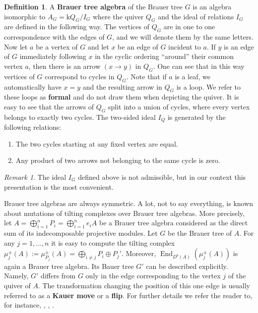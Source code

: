 \documentclass[12pt]{amsart}
\theoremstyle{plain}
\theoremstyle{remark}
\newtheorem*{remark}{Remark}
\theoremstyle{definition}
\newtheorem{definition}{Definition}[section]
\newcommand{\End}{\mathop{\mathrm{End}}\nolimits}
\def\kk{\mathrm{k}}
\begin{document}
\begin{definition} A {\bf Brauer tree algebra} of the Brauer tree $G$ is an algebra isomorphic to $A_G = \kk Q_G/I_G$ where the quiver $Q_G$ and the ideal of relations $I_G$ are defined in the following way. The vertices of $Q_G$ are in one to one correspondence with the edges of $G$, and we will denote them by the same letters. Now let $a$ be a vertex of $G$ and let $x$ be an edge of $G$ incident to $a$. If $y$ is an edge of $G$ immediately following $x$ in the cyclic ordering ``around'' their common vertex $a$, then there is an arrow $(x \to y)$ in $Q_G$. One can see that in this way vertices of $G$ correspond to cycles in $Q_G$. Note that if $a$ is a leaf, we automatically have $x = y$ and the resulting arrow in $Q_G$ is a loop. We refer to these loops as {\bf formal} and do not draw them when depicting the quiver. It is easy to see that the arrows of $Q_G$ split into a union of cycles, where every vertex belongs to exactly two cycles. The two-sided ideal $I_Q$ is generated by the following relations: 

\begin{enumerate}
    \item The two cycles starting at any fixed vertex are equal. 
    \item Any product of two arrows not belonging to the same cycle is zero. 
\end{enumerate}
\end{definition}
\begin{remark} The ideal $I_G$ defined above is not admissible, but in our context this presentation is the most convenient. 
\end{remark}

Brauer tree algebras are always symmetric. A lot, not to say everything, is known about mutations of tilting complexes over Brauer tree algebras. More precisely, let $A = \bigoplus_{i=1}^n P_i = \bigoplus_{i=1}^n e_i A$ be a Brauer tree algebra considered as the direct sum of its indecomposable projective modules. Let $G$ be the Brauer tree of $A$. For any $j = 1, \dots, n$ it is easy to compute the tilting complex $\mu_{j}^{\pm}(A) := \mu_{P_j}^{\pm}(A) = \bigoplus_{i \neq j} P_i \oplus P_j'$. Moreover, $\End_{D^b(A)}(\mu_{j}^{\pm}(A))$ is again a Brauer tree algebra. Its Bauer tree $G'$ can be described explicitly. Namely, $G'$ differs from $G$ only in the edge corresponding to the vertex $j$ of the quiver of $A$. The transformation changing the position of this one edge is usually referred to as a {\bf Kauer move} or a {\bf flip}. For further details we refer the reader to, for instance, \cite{Kauer}, \cite{Aih2}, \cite{Aih3}. 
\end{document}
